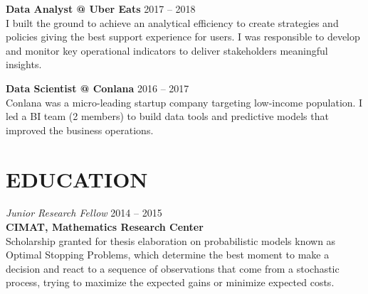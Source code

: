\documentclass[margin]{res}
\begin{document}
\begin{resume}
\textbf{Data Analyst @ Uber Eats} \hfill 2017 -- 2018 \\
I built the ground to achieve an analytical efficiency to create strategies and policies giving the best support experience for users. I was responsible to develop and monitor key operational indicators to deliver stakeholders meaningful insights.


\textbf{Data Scientist @ Conlana} \hfill 2016 -- 2017 \\
Conlana was a micro-leading startup company targeting low-income population. I led a BI team (2 members) to build data tools and predictive models that improved the business operations. 


\section{EDUCATION} 
{\sl Junior Research Fellow} \hfill 2014 -- 2015 \\
\textbf{CIMAT, Mathematics Research Center} \\
Scholarship granted for thesis elaboration on probabilistic models known as Optimal Stopping Problems, which determine the best moment to make a decision and react to a sequence of observations that come from a stochastic process, trying to maximize the expected gains or minimize expected costs.


\end{resume}
\end{document}
